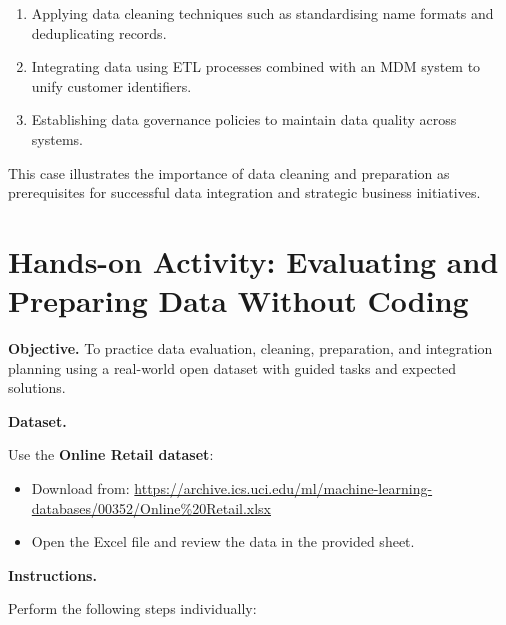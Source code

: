 \begin{enumerate}
	\item Applying data cleaning techniques such as standardising name formats and deduplicating records.
	\item Integrating data using ETL processes combined with an MDM system to unify customer identifiers.
	\item Establishing data governance policies to maintain data quality across systems.
\end{enumerate}

This case illustrates the importance of data cleaning and preparation as prerequisites for successful data integration and strategic business initiatives.


\section{Hands-on Activity: Evaluating and Preparing Data Without Coding}

\textbf{Objective.}  
To practice data evaluation, cleaning, preparation, and integration planning using a real-world open dataset with guided tasks and expected solutions.

\textbf{Dataset.}

Use the \textbf{Online Retail dataset}:

\begin{itemize}
	\item Download from: \url{https://archive.ics.uci.edu/ml/machine-learning-databases/00352/Online%20Retail.xlsx}
	\item Open the Excel file and review the data in the provided sheet.
\end{itemize}

\textbf{Instructions.}

Perform the following steps individually:

